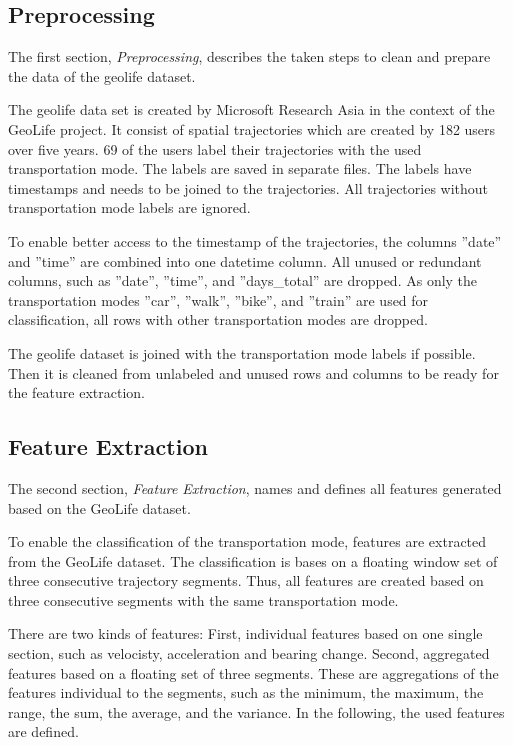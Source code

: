 \subsection{Preprocessing}
The first section, \textit{Preprocessing}, describes the taken steps to clean and prepare the data of the geolife dataset.

The geolife data set \cite{zheng2010geolife} \cite{zheng2008understanding} \cite{geolife-dataset} \cite{zheng2009mining} is created by Microsoft Research Asia in the context of the GeoLife project. It consist of spatial trajectories which are created by 182 users over five years. 69 of the users label their trajectories with the used transportation mode. The labels are saved in separate files. The labels have timestamps and needs to be joined to the trajectories. All trajectories without transportation mode labels are ignored.

To enable better access to the timestamp of the trajectories, the columns ''date'' and ''time'' are combined into one datetime column. All unused or redundant columns, such as ''date'', ''time'', and ''days\_total'' are dropped. As only the transportation modes ''car'', ''walk'', ''bike'', and ''train'' are used for classification, all rows with other transportation modes are dropped. 

The geolife dataset is joined with the transportation mode labels if possible. Then it is cleaned from unlabeled and unused rows and columns to be ready for the feature extraction. 

\subsection{Feature Extraction}
The second section, \textit{Feature Extraction}, names and defines all features generated based on the GeoLife dataset.

To enable the classification of the transportation mode, features are extracted from the GeoLife dataset. The classification is bases on a floating window set of three consecutive trajectory segments. Thus, all features are created based on three consecutive segments with the same transportation mode.

There are two kinds of features: First, individual features based on one single section, such as velocisty, acceleration and bearing change. Second, aggregated features based on a floating set of three segments. These are aggregations of the features individual to the segments, such as the minimum, the maximum, the range, the sum, the average, and the variance. In the following, the used features are defined.

